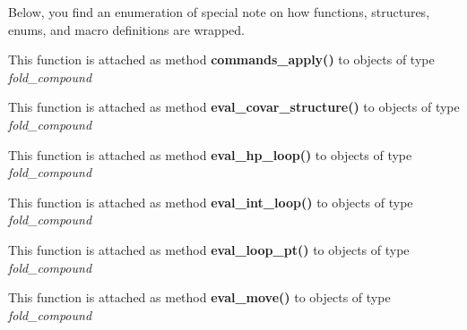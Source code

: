 Below, you find an enumeration of special note on how functions, structures, enums, and macro definitions are wrapped.


\begin{DoxyRefList}
\item[\label{wrappers__wrappers000002}%
\Hypertarget{wrappers__wrappers000002}%
Global \mbox{\hyperlink{commands_8h_a5e993fc4b9602af73aaaab4d3b3cd9a9}{vrna\+\_\+commands\+\_\+apply}} (vrna\+\_\+fold\+\_\+compound\+\_\+t $\ast$vc, vrna\+\_\+cmd\+\_\+t $\ast$commands, unsigned int options)]This function is attached as method {\bfseries commands\+\_\+apply()} to objects of type {\itshape fold\+\_\+compound}  
\item[\label{wrappers__wrappers000026}%
\Hypertarget{wrappers__wrappers000026}%
Global \mbox{\hyperlink{group__eval_ga6cea75c0eb9857fb59172be54cab09e0}{vrna\+\_\+eval\+\_\+covar\+\_\+structure}} (vrna\+\_\+fold\+\_\+compound\+\_\+t $\ast$vc, const char $\ast$structure)]This function is attached as method {\bfseries eval\+\_\+covar\+\_\+structure()} to objects of type {\itshape fold\+\_\+compound}  
\item[\label{wrappers__wrappers000030}%
\Hypertarget{wrappers__wrappers000030}%
Global \mbox{\hyperlink{group__loops_gab3eb4651dc26dc2b653a57dd340d7e68}{vrna\+\_\+eval\+\_\+hp\+\_\+loop}} (vrna\+\_\+fold\+\_\+compound\+\_\+t $\ast$vc, int i, int j)]This function is attached as method {\bfseries eval\+\_\+hp\+\_\+loop()} to objects of type {\itshape fold\+\_\+compound}  
\item[\label{wrappers__wrappers000031}%
\Hypertarget{wrappers__wrappers000031}%
Global \mbox{\hyperlink{group__loops_ga018f1314dbbae42fdd27c94670b61721}{vrna\+\_\+eval\+\_\+int\+\_\+loop}} (vrna\+\_\+fold\+\_\+compound\+\_\+t $\ast$vc, int i, int j, int k, int l)]This function is attached as method {\bfseries eval\+\_\+int\+\_\+loop()} to objects of type {\itshape fold\+\_\+compound}  
\item[\label{wrappers__wrappers000027}%
\Hypertarget{wrappers__wrappers000027}%
Global \mbox{\hyperlink{group__eval_ga730ba4df55c02fd530a0cddd49faf760}{vrna\+\_\+eval\+\_\+loop\+\_\+pt}} (vrna\+\_\+fold\+\_\+compound\+\_\+t $\ast$vc, int i, const short $\ast$pt)]This function is attached as method {\bfseries eval\+\_\+loop\+\_\+pt()} to objects of type {\itshape fold\+\_\+compound}  
\item[\label{wrappers__wrappers000028}%
\Hypertarget{wrappers__wrappers000028}%
Global \mbox{\hyperlink{group__eval_gaff1b9e4f4d17b434b0a822fe783672c1}{vrna\+\_\+eval\+\_\+move}} (vrna\+\_\+fold\+\_\+compound\+\_\+t $\ast$vc, const char $\ast$structure, int m1, int m2)]This function is attached as method {\bfseries eval\+\_\+move()} to objects of type {\itshape fold\+\_\+compound}  

\end{DoxyRefList}
